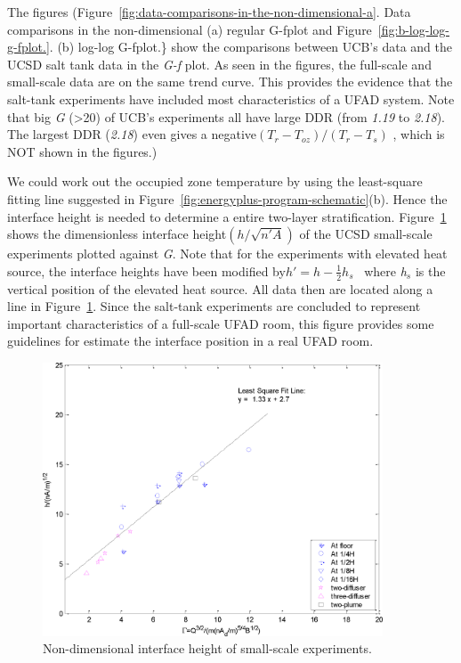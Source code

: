 The figures (Figure~\ref{fig:data-comparisons-in-the-non-dimensional-a}. Data comparisons in the non-dimensional (a) regular G-fplot and Figure~\ref{fig:b-log-log-g-fplot.}. (b) log-log G-fplot.\} show the comparisons between UCB's data and the UCSD salt tank data in the \emph{G-f} plot. As seen in the figures, the full-scale and small-scale data are on the same trend curve. This provides the evidence that the salt-tank experiments have included most characteristics of a UFAD system. Note that big \emph{G} (\textgreater{}20) of UCB's experiments all have large DDR (from \emph{1.19} to \emph{2.18}). The largest DDR (\emph{2.18}) even gives a negative\(({T_r} - {T_{oz}})/({T_r} - {T_s})\) , which is NOT shown in the figures.)

We could work out the occupied zone temperature by using the least-square fitting line suggested in Figure~\ref{fig:energyplus-program-schematic}(b). Hence the interface height is needed to determine a entire two-layer stratification. Figure~\ref{fig:non-dimensional-interface-height-of-small} shows the dimensionless interface height\((h/\sqrt {n'A} )\) of the UCSD small-scale experiments plotted against \emph{G}. Note that for the experiments with elevated heat source, the interface heights have been modified by\(h' = h - \frac{1}{2}{h_s}\) ~where \emph{h\(_{s}\)} is the vertical position of the elevated heat source. All data then are located along a line in Figure~\ref{fig:non-dimensional-interface-height-of-small}. Since the salt-tank experiments are concluded to represent important characteristics of a full-scale UFAD room, this figure provides some guidelines for estimate the interface position in a real UFAD room.

\begin{figure}[hbtp] %
\centering
\includegraphics[width=0.9\textwidth, height=0.9\textheight, keepaspectratio=true]{media/image2474.png}
\caption{Non-dimensional interface height of small-scale experiments. \protect \label{fig:non-dimensional-interface-height-of-small}}
\end{figure}

